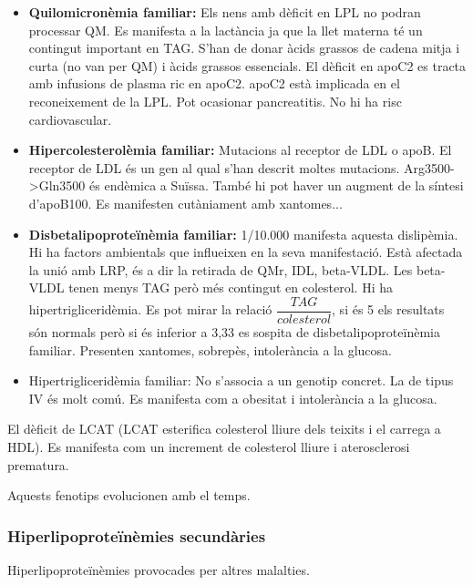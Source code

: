 \begin{itemize}
\item \textbf{Quilomicronèmia familiar:} Els nens amb dèficit en LPL no podran
  processar QM. Es manifesta a la lactància ja que la llet materna té
  un contingut important en TAG. S'han de donar àcids grassos de
  cadena mitja i curta (no van per QM) i àcids grassos essencials. El
  dèficit en apoC2 es tracta amb infusions de plasma ric en
  apoC2. apoC2 està implicada en el reconeixement de la LPL. Pot
  ocasionar pancreatitis. No hi ha risc cardiovascular.

\item \textbf{Hipercolesterolèmia familiar:} Mutacions al receptor de LDL o
  apoB. El receptor de LDL és un gen al qual s'han descrit moltes
  mutacions. Arg3500->Gln3500 és endèmica a Suïssa. També hi pot haver
  un augment de la síntesi d'apoB100. Es manifesten cutàniament amb
  xantomes...

\item \textbf{Disbetalipoproteïnèmia familiar:} 1/10.000 manifesta
  aquesta dislipèmia. Hi ha factors ambientals que influeixen en la
  seva manifestació. Està afectada la unió amb LRP, és a dir la
  retirada de QMr, IDL, beta-VLDL. Les beta-VLDL tenen menys TAG però
  més contingut en colesterol. Hi ha hipertrigliceridèmia. Es pot
  mirar la relació $\dfrac{TAG}{colesterol}$, si és 5 els resultats
  són normals però si és inferior a 3,33 es sospita de
  disbetalipoproteïnèmia familiar. Presenten xantomes, sobrepès,
  intolerància a la glucosa.

\item Hipertrigliceridèmia familiar: No s'associa a un genotip
  concret. La de tipus IV és molt comú. Es manifesta com a obesitat i
  intolerància a la glucosa.
\end{itemize}

El dèficit de LCAT (LCAT esterifica colesterol lliure dels teixits i
el carrega a HDL). Es manifesta com un increment de colesterol lliure
i aterosclerosi prematura.

Aquests fenotips evolucionen amb el temps.

\subsubsection{Hiperlipoproteïnèmies secundàries}
\label{sec:hiperl-secund}
Hiperlipoproteïnèmies provocades per altres malalties.


